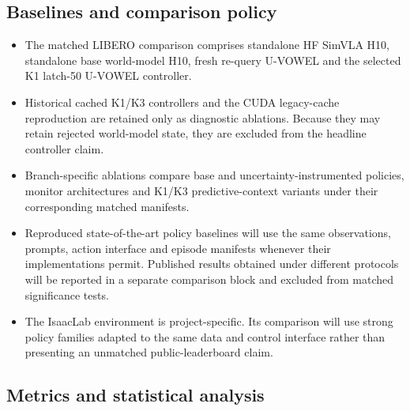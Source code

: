 \subsection{Baselines and comparison policy}

\begin{itemize}
  \item The matched LIBERO comparison comprises standalone HF SimVLA H10,
  standalone base world-model H10, fresh re-query U-VOWEL and the selected K1
  latch-50 U-VOWEL controller.

  \item Historical cached K1/K3 controllers and the CUDA legacy-cache
  reproduction are retained only as diagnostic ablations. Because they may
  retain rejected world-model state, they are excluded from the headline
  controller claim.

  \item Branch-specific ablations compare base and uncertainty-instrumented
  policies, monitor architectures and K1/K3 predictive-context variants under
  their corresponding matched manifests.

  \item Reproduced state-of-the-art policy baselines will use the same
  observations, prompts, action interface and episode manifests whenever their
  implementations permit. Published results obtained under different protocols
  will be reported in a separate comparison block and excluded from matched
  significance tests.

  \item The IsaacLab environment is project-specific. Its comparison will use
  strong policy families adapted to the same data and control interface rather
  than presenting an unmatched public-leaderboard claim.
\end{itemize}

\subsection{Metrics and statistical analysis}

